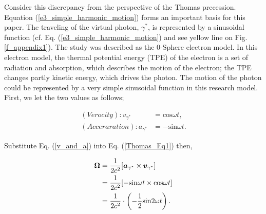\documentclass[%
 reprint,
 amsmath,amssymb,
 aps,
]{revtex4-1}
\numberwithin{equation}{section}%
\begin{document}
Consider this discrepancy from the perspective of the Thomas precession. Equation (\ref{e3_simple_harmonic_motion}) forms an important basis for this paper. The traveling of the virtual photon, ${\gamma^{*}}$, is represented by a sinusoidal function (cf. Eq. (\ref{e3_simple_harmonic_motion}) and see yellow line on Fig. \ref{f_appendix1}). The study was described as the 0-Sphere electron model. In this electron model, the thermal potential  energy (TPE) of the electron is a set of radiation and absorption, which describes the motion of the electron; the TPE changes partly kinetic energy, which drives the photon. The motion of the photon could be represented by a very simple sinusoidal function in this research model. First, we let the two values as follows;

    \begin{equation}
        \begin{split}
            (Verocity): v_{\gamma^{*}}
                &= \mathrm{cos}\omega t , \\
            (Acceraration): a_{\gamma^{*}}
                &= - \mathrm{sin}\omega t
                .
        \label{v_and_a}
        \end{split}
    \end{equation}

Substitute Eq. (\ref{v_and_a}) into Eq. (\ref{Thomas_Eq1}) then,

    \begin{equation}
        \begin{split}
            {\bf \Omega} 
                &= \frac{1}{2 c^2}[{\boldsymbol a_{\gamma^{*}}} \times {\boldsymbol v_{\gamma^{*}}} ]  \\
                &= \frac{1}{2 c^2} [ -\mathrm{sin}\omega t \times \mathrm{cos}\omega t ] \\
                &= \frac{1}{2 c^2} \cdot \left( - \frac{1}{2} \mathrm{sin}2\omega t \right)
                .
        \label{omega_sin}
        \end{split}
    \end{equation}


\end{document}
